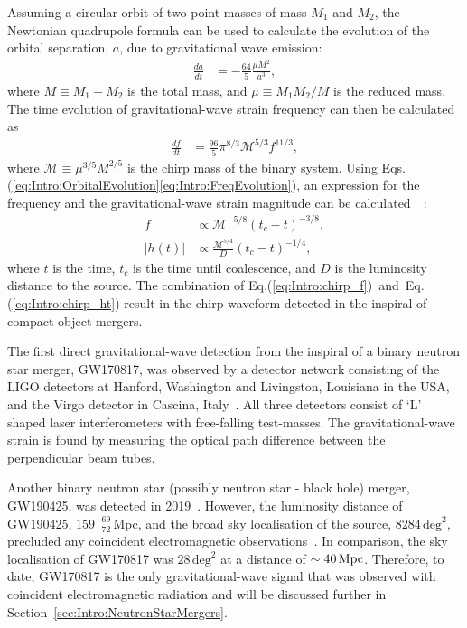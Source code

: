 \documentclass[../Thesis.tex]{subfiles}
\begin{document}
    Assuming a circular orbit of two point masses of mass $M_1$ and $M_2$, the Newtonian quadrupole formula can be used to calculate the evolution of the orbital separation, $a$, due to gravitational wave emission:~\cite[e.g.,][]{Cutler1994}
    \begin{align}
        \frac{da}{dt} & = -\frac{64}{5}\frac{\mu M^2}{a^3}, \label{eq:Intro:OrbitalEvolution}        
    \end{align}
    where  $M \equiv M_1 + M_2$ is the total mass, and $\mu \equiv M_1 M_2 / M$ is the reduced mass.
    The time evolution of gravitational-wave strain frequency can then be calculated as
    \begin{align}
        \frac{df}{dt} & = \frac{96}{5}\pi^{8/3}\mathcal{M}^{5/3}f^{11/3}, \label{eq:Intro:FreqEvolution}        
    \end{align}   
    where $\mathcal{M} \equiv \mu^{3/5} M^{2/5}$ is the chirp mass of the binary system. 
    Using Eqs.(\ref{eq:Intro:OrbitalEvolution}\Hyphdash*\ref{eq:Intro:FreqEvolution}), an expression for the frequency and the gravitational-wave strain magnitude can be calculated~~\cite[e.g.,][]{Cutler1994}: 
      \begin{align}
      f &  \propto \mathcal{M}^{- 5/8}(t_c-t)^{- 3/8},\label{eq:Intro:chirp_f}\\
        |h(t)| & \propto  \frac{\mathcal{M}^{5/4}}{D}(t_c-t)^{-1/4}, \label{eq:Intro:chirp_ht} 
    \end{align}
    where $t$ is the time, $t_c$ is the time until coalescence, and $D$ is the luminosity distance to the source. 
    The combination of Eq.(\ref{eq:Intro:chirp_f})~and~Eq.(\ref{eq:Intro:chirp_ht}) result in the chirp waveform detected in the inspiral of compact object mergers.
    \par
    The first direct gravitational-wave detection from the inspiral of a binary neutron star merger, GW170817, was observed by a detector network consisting of the LIGO detectors at Hanford, Washington and Livingston, Louisiana in the USA, and the Virgo detector in Cascina, Italy~\cite{AdvancedLIGO2015,AdvancedVirgo2015,GW170817Detection}. 
    All three detectors consist of `L' shaped laser interferometers with free-falling test-masses.
    The gravitational-wave strain is found by measuring the optical path difference between the perpendicular beam tubes. \par
    
    Another binary neutron star (possibly neutron star - black hole) merger, GW190425, was detected in 2019~\cite{GW190425Detection,GWTC2,PopGWTC2}.  However, the luminosity distance of GW190425, $159^{+69}_{-72}\,$Mpc, and the broad sky localisation of the source, $8284\,\mathrm{deg}^2$, precluded any coincident electromagnetic observations~\cite{GW190425Detection}. In comparison, the sky localisation of GW170817 was $28\,\mathrm{deg}^2$ at a distance of $\sim 40\,\mathrm{Mpc}$.
    Therefore, to date, GW170817 is the only gravitational-wave signal that was observed with coincident electromagnetic radiation and will be discussed further in Section~\ref{sec:Intro:NeutronStarMergers}.
    
\end{document}
